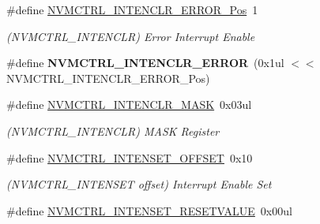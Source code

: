 \begin{DoxyCompactItemize}
\item 
\hypertarget{group___s_a_m_l21___n_v_m_c_t_r_l_gaefcc9c986918d880edfb8b05fe0a6bcb}{}\#define \hyperlink{group___s_a_m_l21___n_v_m_c_t_r_l_gaefcc9c986918d880edfb8b05fe0a6bcb}{N\+V\+M\+C\+T\+R\+L\+\_\+\+I\+N\+T\+E\+N\+C\+L\+R\+\_\+\+E\+R\+R\+O\+R\+\_\+\+Pos}~1\label{group___s_a_m_l21___n_v_m_c_t_r_l_gaefcc9c986918d880edfb8b05fe0a6bcb}

\begin{DoxyCompactList}\small\item\em (N\+V\+M\+C\+T\+R\+L\+\_\+\+I\+N\+T\+E\+N\+C\+L\+R) Error Interrupt Enable \end{DoxyCompactList}\item 
\hypertarget{group___s_a_m_l21___n_v_m_c_t_r_l_ga21e287f2b5ff9239dd9cca1068d6a5a5}{}\#define {\bfseries N\+V\+M\+C\+T\+R\+L\+\_\+\+I\+N\+T\+E\+N\+C\+L\+R\+\_\+\+E\+R\+R\+O\+R}~(0x1ul $<$$<$ N\+V\+M\+C\+T\+R\+L\+\_\+\+I\+N\+T\+E\+N\+C\+L\+R\+\_\+\+E\+R\+R\+O\+R\+\_\+\+Pos)\label{group___s_a_m_l21___n_v_m_c_t_r_l_ga21e287f2b5ff9239dd9cca1068d6a5a5}

\item 
\hypertarget{group___s_a_m_l21___n_v_m_c_t_r_l_ga399cac515ae8b6bfd864314732defbe9}{}\#define \hyperlink{group___s_a_m_l21___n_v_m_c_t_r_l_ga399cac515ae8b6bfd864314732defbe9}{N\+V\+M\+C\+T\+R\+L\+\_\+\+I\+N\+T\+E\+N\+C\+L\+R\+\_\+\+M\+A\+S\+K}~0x03ul\label{group___s_a_m_l21___n_v_m_c_t_r_l_ga399cac515ae8b6bfd864314732defbe9}

\begin{DoxyCompactList}\small\item\em (N\+V\+M\+C\+T\+R\+L\+\_\+\+I\+N\+T\+E\+N\+C\+L\+R) M\+A\+S\+K Register \end{DoxyCompactList}\item 
\hypertarget{group___s_a_m_l21___n_v_m_c_t_r_l_gacbc15881a076ca6d111540304e571a20}{}\#define \hyperlink{group___s_a_m_l21___n_v_m_c_t_r_l_gacbc15881a076ca6d111540304e571a20}{N\+V\+M\+C\+T\+R\+L\+\_\+\+I\+N\+T\+E\+N\+S\+E\+T\+\_\+\+O\+F\+F\+S\+E\+T}~0x10\label{group___s_a_m_l21___n_v_m_c_t_r_l_gacbc15881a076ca6d111540304e571a20}

\begin{DoxyCompactList}\small\item\em (N\+V\+M\+C\+T\+R\+L\+\_\+\+I\+N\+T\+E\+N\+S\+E\+T offset) Interrupt Enable Set \end{DoxyCompactList}\item 
\hypertarget{group___s_a_m_l21___n_v_m_c_t_r_l_gad48eea420ef04c6f0c75a074991ad6d6}{}\#define \hyperlink{group___s_a_m_l21___n_v_m_c_t_r_l_gad48eea420ef04c6f0c75a074991ad6d6}{N\+V\+M\+C\+T\+R\+L\+\_\+\+I\+N\+T\+E\+N\+S\+E\+T\+\_\+\+R\+E\+S\+E\+T\+V\+A\+L\+U\+E}~0x00ul\label{group___s_a_m_l21___n_v_m_c_t_r_l_gad48eea420ef04c6f0c75a074991ad6d6}


\end{DoxyCompactItemize}
